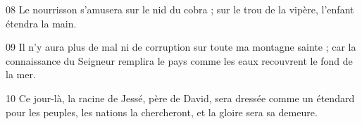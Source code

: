 
08 Le nourrisson s’amusera sur le nid du cobra ; sur le trou de la vipère, l’enfant étendra la main.

09 Il n’y aura plus de mal ni de corruption sur toute ma montagne sainte ; car la connaissance du Seigneur remplira le pays comme les eaux recouvrent le fond de la mer.

10 Ce jour-là, la racine de Jessé, père de David, sera dressée comme un étendard pour les peuples, les nations la chercheront, et la gloire sera sa demeure.